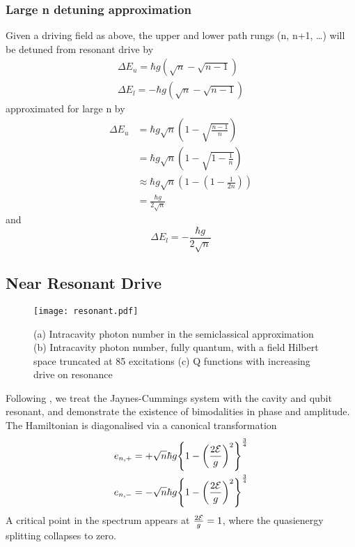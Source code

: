 \subsubsection{Large n detuning approximation}\cite{Alsing1990}
Given a driving field as above, the upper and lower path rungs (n, n+1, \dots) will be detuned from resonant drive by
\begin{align}
  \Delta E_u = \hbar g (\sqrt{n}-\sqrt{n-1}) \\
  \Delta E_l = -\hbar g (\sqrt{n}-\sqrt{n-1})
\end{align}
approximated for large n by
\begin{align}
  \Delta E_u &= \hbar g \sqrt{n} \left (1-\sqrt{\frac{n-1}{n}} \right ) \\
  &= \hbar g \sqrt{n} \left (1-\sqrt{1-\frac{1}{n}} \right ) \\
  & \approx \hbar g \sqrt{n} \left ( 1- \left ( 1 - \frac{1}{2n} \right ) \right ) \\
  &= \frac{\hbar g}{2 \sqrt{n}}
\end{align}
and
\begin{equation}
  \Delta E_l = -\frac{\hbar g}{2 \sqrt{n}}
\end{equation}
\subsection{Near Resonant Drive}
\begin{figure*}[ht]
    \texttt{[image: resonant.pdf]}
    \caption{(a) Intracavity photon number in the semiclassical approximation (b) Intracavity photon number, fully quantum, with a field Hilbert space truncated at 85 excitations (c) Q functions with increasing drive on resonance}
\end{figure*}
Following \cite{Carmichael2015}, we treat the Jaynes-Cummings system with the cavity and qubit resonant, and demonstrate the existence of bimodalities in phase and amplitude.
The Hamiltonian is diagonalised via a canonical transformation
\begin{align}
  e_{n, +} &= + \sqrt{n} \hbar g {\left \{1 - {\left ({\frac{2\mathcal{E}}{g}} \right )}^2 \right \}}^{\frac{3}{4}} \\
  e_{n, -} &= - \sqrt{n} \hbar g {\left \{1 - {\left ({\frac{2\mathcal{E}}{g}} \right )}^2 \right \}}^{\frac{3}{4}}
\end{align}
A critical point in the spectrum appears at $\frac{2\mathcal{E}}{g} = 1$, where the quasienergy splitting collapses to zero.
